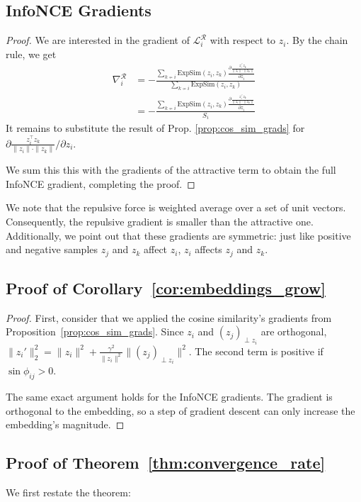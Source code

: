\subsection{InfoNCE Gradients}
\label{app:infonce_grads}
\infoncegrads*
\begin{proof}
    We are interested in the gradient of $\mathcal{L}_i^\mathcal{R}$ with respect to $z_i$. By the chain rule, we get
    \begin{align*}
        \nabla_i^\mathcal{R} &= -\frac{\sum_{k \not\sim i} \text{ExpSim}(z_i, z_k) \frac{\partial \frac{z_i^\top z_k}{\|z_i\| \cdot \|z_k\|}}{\partial z_i}}{\sum_{k \not\sim i} \text{ExpSim}(z_i, z_k)} \\
        &= -\frac{\sum_{k \not\sim i} \text{ExpSim}(z_i, z_k) \frac{\partial \frac{z_i^\top z_k}{\|z_i\| \cdot \|z_k\|}}{\partial z_i}}{S_i}
    \end{align*}
    It remains to substitute the result of Prop. \ref{prop:cos_sim_grads} for $\partial \frac{z_i^\top z_k}{\|z_i\| \cdot \|z_k\|} / \partial z_i$.

    We sum this this with the gradients of the attractive term to obtain the full InfoNCE gradient, completing the proof.
\end{proof}

We note that the repulsive force is weighted average over a set of unit vectors. Consequently, the repulsive gradient is smaller than the attractive one. Additionally, we point out that these gradients are symmetric: just like positive and negative samples $z_j$ and $z_k$ affect $z_i$, $z_i$ affects $z_j$ and $z_k$.

\subsection{Proof of Corollary~\ref{cor:embeddings_grow}}
\label{prf:cor_embeddings_grow}
\begin{proof}
    First, consider that we applied the cosine similarity's gradients from Proposition~\ref{prop:cos_sim_grads}. Since $z_i$ and $(z_j)_{\perp z_i}$ are orthogonal, $\|z_i'\|_2^2 = \|z_i\|^2 + \frac{\gamma^2}{\|z_i\|^2}\|(z_j)_{\perp z_i}\|^2$. The second term is positive if $\sin \phi_{ij} > 0$.

    The same exact argument holds for the InfoNCE gradients. The gradient is orthogonal to the embedding, so a step of gradient descent can only increase the embedding's magnitude.
\end{proof}

\subsection{Proof of Theorem~\ref{thm:convergence_rate}}
\label{prf:thm_convergence_rate}
We first restate the theorem:

